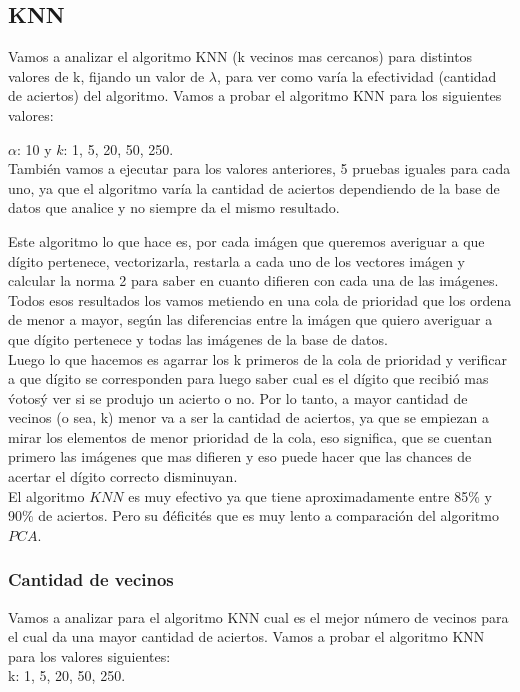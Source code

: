 \subsection{KNN}
Vamos a analizar el algoritmo KNN (k vecinos mas cercanos) para distintos valores de k, fijando un valor de $\lambda$, para ver como varía la efectividad (cantidad de aciertos) del algoritmo.
Vamos a probar el algoritmo KNN para los siguientes valores:

$\alpha$: 10  y $k$: 1, 5, 20, 50, 250.\\

También vamos a ejecutar para los valores anteriores, 5 pruebas iguales para cada uno, ya que el algoritmo varía la cantidad de aciertos dependiendo de la base de datos que analice y no siempre da el mismo resultado.

Este algoritmo lo que hace es, por cada imágen que queremos averiguar a que dígito pertenece, vectorizarla, restarla a cada uno de los vectores imágen y calcular la norma 2 para saber en cuanto difieren con cada una de las imágenes.
Todos esos resultados los vamos metiendo en una cola de prioridad que los ordena de menor a mayor, según las diferencias entre la imágen que quiero averiguar a que dígito pertenece y todas las imágenes de la base de datos.
\\
Luego lo que hacemos es agarrar los k primeros de la cola de prioridad y verificar a que dígito se corresponden para luego saber cual es el dígito que recibió mas \'votos\' y ver si se produjo un acierto o no.
Por lo tanto, a mayor cantidad de vecinos (o sea, k) menor va a ser la cantidad de aciertos, ya que se empiezan a mirar los elementos de menor prioridad de la cola, eso significa, que se cuentan primero las imágenes que mas difieren y eso puede hacer que las chances de acertar el dígito correcto disminuyan.
\\
El algoritmo $KNN$ es muy efectivo ya que tiene aproximadamente entre 85\% y 90\% de aciertos. Pero su \'déficit\' es que es muy lento a comparación del algoritmo $PCA$. 

\subsubsection{Cantidad de vecinos}
Vamos a analizar para el algoritmo KNN cual es el mejor número de vecinos para el cual da una mayor cantidad de aciertos.
Vamos a probar el algoritmo KNN para los valores siguientes:\\
k: 1, 5, 20, 50, 250.\\

